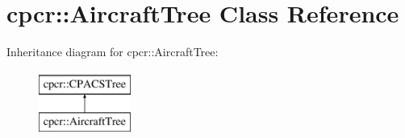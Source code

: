 \hypertarget{classcpcr_1_1AircraftTree}{\section{cpcr\-:\-:Aircraft\-Tree Class Reference}
\label{classcpcr_1_1AircraftTree}
}
Inheritance diagram for cpcr\-:\-:Aircraft\-Tree\-:\begin{figure}[H]
\begin{center}
\leavevmode
\includegraphics[height=2.000000cm]{classcpcr_1_1AircraftTree}
\end{center}
\end{figure}
